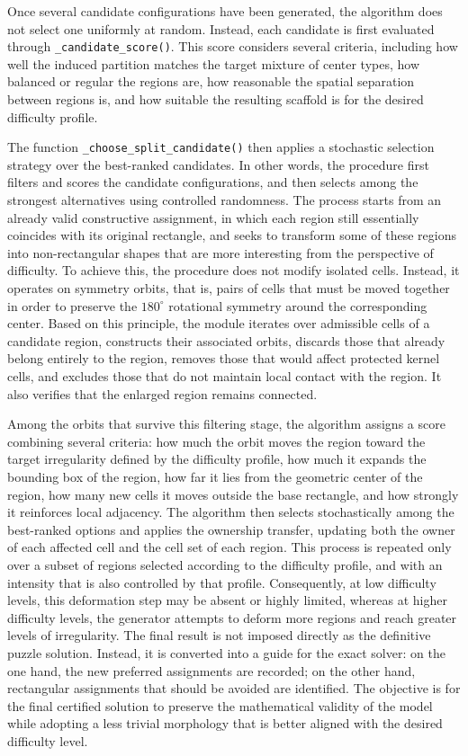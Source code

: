 Once several candidate configurations have been generated, the algorithm does not select one uniformly at random. Instead, each candidate is first evaluated through \texttt{\_candidate\_score()}. This score considers several criteria, including how well the induced partition matches the target mixture of center types, how balanced or regular the regions are, how reasonable the spatial separation between regions is, and how suitable the resulting scaffold is for the desired difficulty profile.

The function \texttt{\_choose\_split\_candidate()} then applies a stochastic selection strategy over the best-ranked candidates. In other words, the procedure first filters and scores the candidate configurations, and then selects among the strongest alternatives using controlled randomness. The process starts from an already valid constructive assignment, in which each region still essentially coincides with its original rectangle, and seeks to transform some of these regions into non-rectangular shapes that are more interesting from the perspective of difficulty. To achieve this, the procedure does not modify isolated cells. Instead, it operates on symmetry orbits, that is, pairs of cells that must be moved together in order to preserve the \(180^\circ\) rotational symmetry around the corresponding center. Based on this principle, the module iterates over admissible cells of a candidate region, constructs their associated orbits, discards those that already belong entirely to the region, removes those that would affect protected kernel cells, and excludes those that do not maintain local contact with the region. It also verifies that the enlarged region remains connected.

Among the orbits that survive this filtering stage, the algorithm assigns a score combining several criteria: how much the orbit moves the region toward the target irregularity defined by the difficulty profile, how much it expands the bounding box of the region, how far it lies from the geometric center of the region, how many new cells it moves outside the base rectangle, and how strongly it reinforces local adjacency. The algorithm then selects stochastically among the best-ranked options and applies the ownership transfer, updating both the owner of each affected cell and the cell set of each region. This process is repeated only over a subset of regions selected according to the difficulty profile, and with an intensity that is also controlled by that profile. Consequently, at low difficulty levels, this deformation step may be absent or highly limited, whereas at higher difficulty levels, the generator attempts to deform more regions and reach greater levels of irregularity. The final result is not imposed directly as the definitive puzzle solution. Instead, it is converted into a guide for the exact solver: on the one hand, the new preferred assignments are recorded; on the other hand, rectangular assignments that should be avoided are identified. The objective is for the final certified solution to preserve the mathematical validity of the model while adopting a less trivial morphology that is better aligned with the desired difficulty level.

